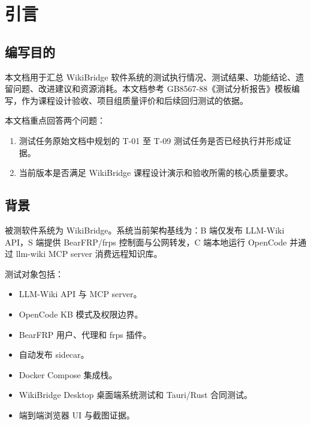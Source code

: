 \documentclass[UTF8,a4paper,12pt,fontset=fandol]{ctexart}
\begin{document}
\newpage
\tableofcontents
\newpage
{}

\section{引言}

\subsection{编写目的}
本文档用于汇总 WikiBridge 软件系统的测试执行情况、测试结果、功能结论、遗留问题、改进建议和资源消耗。本文档参考 GB8567-88《测试分析报告》模板编写，作为课程设计验收、项目组质量评价和后续回归测试的依据。

本文档重点回答两个问题：
\begin{enumerate}
  \item 测试任务原始文档中规划的 T-01 至 T-09 测试任务是否已经执行并形成证据。
  \item 当前版本是否满足 WikiBridge 课程设计演示和验收所需的核心质量要求。
\end{enumerate}

\subsection{背景}
被测软件系统为 WikiBridge。系统当前架构基线为：B 端仅发布 LLM-Wiki API，S 端提供 BearFRP/frps 控制面与公网转发，C 端本地运行 OpenCode 并通过 llm-wiki MCP server 消费远程知识库。

测试对象包括：
\begin{itemize}
  \item LLM-Wiki API 与 MCP server。
  \item OpenCode KB 模式及权限边界。
  \item BearFRP 用户、代理和 frps 插件。
  \item 自动发布 sidecar。
  \item Docker Compose 集成栈。
  \item WikiBridge Desktop 桌面端系统测试和 Tauri/Rust 合同测试。
  \item 端到端浏览器 UI 与截图证据。
\end{itemize}
\end{document}
